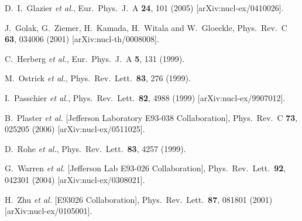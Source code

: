 \documentclass[12pt]{article}
\begin{document}
\begin{thebibliography}{99}
  D.~I.~Glazier {\it et al.},
  Eur.\ Phys.\ J.\  A {\bf 24}, 101 (2005)
  [arXiv:nucl-ex/0410026].

  J.~Golak, G.~Ziemer, H.~Kamada, H.~Witala and W.~Gloeckle,
  Phys.\ Rev.\  C {\bf 63}, 034006 (2001)
  [arXiv:nucl-th/0008008].

  C.~Herberg {\it et al.},
  Eur.\ Phys.\ J.\  A {\bf 5}, 131 (1999).

  M.~Ostrick {\it et al.},
  Phys.\ Rev.\ Lett.\  {\bf 83}, 276 (1999).

  I.~Passchier {\it et al.},
  Phys.\ Rev.\ Lett.\  {\bf 82}, 4988 (1999)
  [arXiv:nucl-ex/9907012].

  B.~Plaster {\it et al.}  [Jefferson Laboratory E93-038 Collaboration],
  Phys.\ Rev.\  C {\bf 73}, 025205 (2006)
  [arXiv:nucl-ex/0511025].

  D.~Rohe {\it et al.},
  Phys.\ Rev.\ Lett.\  {\bf 83}, 4257 (1999).

  G.~Warren {\it et al.}  [Jefferson Lab E93-026 Collaboration],
  Phys.\ Rev.\ Lett.\  {\bf 92}, 042301 (2004)
  [arXiv:nucl-ex/0308021].

  H.~Zhu {\it et al.}  [E93026 Collaboration],
  Phys.\ Rev.\ Lett.\  {\bf 87}, 081801 (2001)
  [arXiv:nucl-ex/0105001].


\end{thebibliography}
\end{document}
